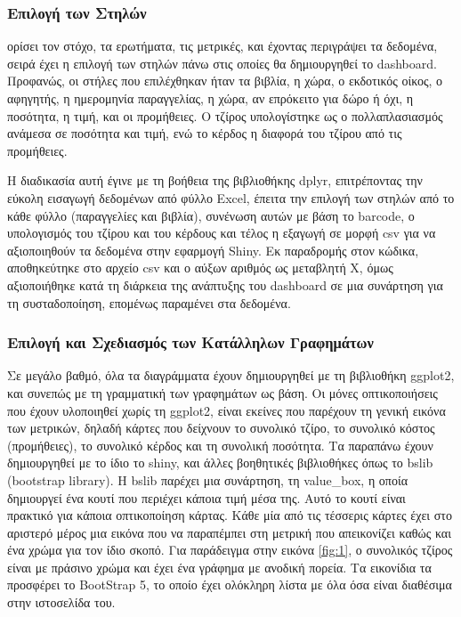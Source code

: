 \documentclass{article}
\begin{document}
\subsubsection{Επιλογή των Στηλών}

 ορίσει τον στόχο, τα ερωτήματα, τις μετρικές, και έχοντας περιγράψει τα δεδομένα, σειρά έχει η επιλογή των στηλών πάνω στις οποίες θα δημιουργηθεί το dashboard. Προφανώς, οι στήλες που επιλέχθηκαν ήταν τα βιβλία, η χώρα, ο εκδοτικός οίκος, ο αφηγητής, η ημερομηνία παραγγελίας, η χώρα, αν επρόκειτο για δώρο ή όχι, η ποσότητα, η τιμή, και οι προμήθειες. Ο τζίρος υπολογίστηκε ως ο πολλαπλασιασμός ανάμεσα σε ποσότητα και τιμή, ενώ το κέρδος η διαφορά του τζίρου από τις προμήθειες.

Η διαδικασία αυτή έγινε με τη βοήθεια της βιβλιοθήκης dplyr, επιτρέποντας την εύκολη εισαγωγή δεδομένων από φύλλο Excel, έπειτα την επιλογή των στηλών από το κάθε φύλλο (παραγγελίες και βιβλία), συνένωση αυτών με βάση το barcode, ο υπολογισμός του τζίρου και του κέρδους και τέλος η εξαγωγή σε μορφή csv για να αξιοποιηθούν τα δεδομένα στην εφαρμογή Shiny. Εκ παραδρομής στον κώδικα, αποθηκεύτηκε στο αρχείο csv και ο αύξων αριθμός ως μεταβλητή Χ, όμως αξιοποιήθηκε κατά τη διάρκεια της ανάπτυξης του dashboard σε μια συνάρτηση για τη συσταδοποίηση, επομένως παραμένει στα δεδομένα.

\subsubsection{Επιλογή και Σχεδιασμός των Κατάλληλων Γραφημάτων}

Σε μεγάλο βαθμό, όλα τα διαγράμματα έχουν δημιουργηθεί με τη βιβλιοθήκη ggplot2, και συνεπώς με τη γραμματική των γραφημάτων ως βάση. Οι μόνες οπτικοποιήσεις που έχουν υλοποιηθεί χωρίς τη ggplot2, είναι εκείνες που παρέχουν τη γενική εικόνα των μετρικών, δηλαδή κάρτες που δείχνουν το συνολικό τζίρο, το συνολικό κόστος (προμήθειες), το συνολικό κέρδος και τη συνολική ποσότητα. Τα παραπάνω έχουν δημιουργηθεί με το ίδιο το shiny, και άλλες βοηθητικές βιβλιοθήκες όπως το bslib (bootstrap library). Η bslib παρέχει μια συνάρτηση, τη value\_box, η οποία δημιουργεί ένα κουτί που περιέχει κάποια τιμή μέσα της. Αυτό το κουτί είναι πρακτικό για κάποια οπτικοποίηση κάρτας. Κάθε μία από τις τέσσερις κάρτες έχει στο αριστερό μέρος μια εικόνα που να παραπέμπει στη μετρική που απεικονίζει καθώς και ένα χρώμα για τον ίδιο σκοπό. Για παράδειγμα στην εικόνα \ref{fig:1}, ο συνολικός τζίρος είναι με πράσινο χρώμα και έχει ένα γράφημα με ανοδική πορεία. Τα εικονίδια τα προσφέρει το BootStrap 5, το οποίο έχει ολόκληρη λίστα με όλα όσα είναι διαθέσιμα στην ιστοσελίδα του.
\end{document}
